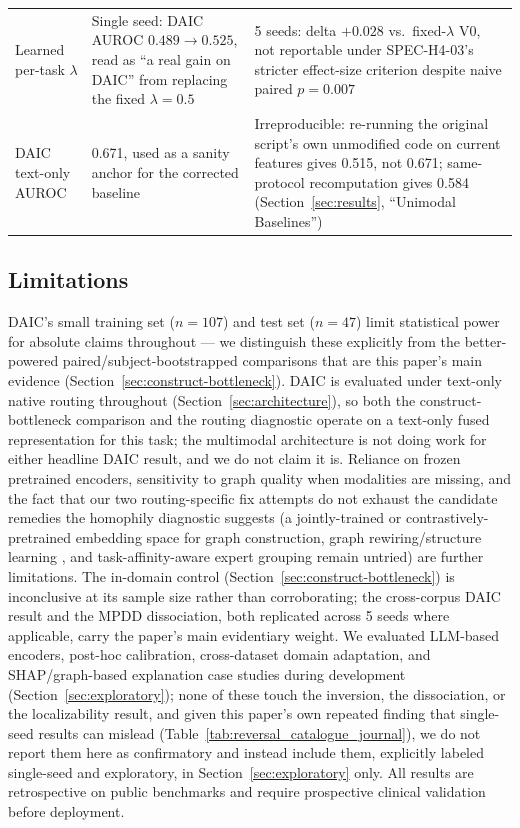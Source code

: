 \documentclass[twocolumn]{article}
\begin{document}
\begin{table}[t]
\begin{tabular}{p{}p{}p{}}
Learned per-task $\lambda$ & Single seed: DAIC AUROC $0.489 \to 0.525$, read as ``a real gain on DAIC'' from replacing the fixed $\lambda{=}0.5$ & 5 seeds: delta $+0.028$ vs.\ fixed-$\lambda$ V0, not reportable under SPEC-H4-03's stricter effect-size criterion despite naive paired $p{=}0.007$ \\
DAIC text-only AUROC & 0.671, used as a sanity anchor for the corrected baseline & Irreproducible: re-running the original script's own unmodified code on current features gives 0.515, not 0.671; same-protocol recomputation gives 0.584 (Section~\ref{sec:results}, ``Unimodal Baselines'') \\
\bottomrule
\end{tabular}
\end{table}

\subsection{Limitations}

DAIC's small training set ($n{=}107$) and test set ($n{=}47$) limit statistical power for absolute claims throughout — we distinguish these explicitly from the better-powered paired/subject-bootstrapped comparisons that are this paper's main evidence (Section~\ref{sec:construct-bottleneck}). DAIC is evaluated under text-only native routing throughout (Section~\ref{sec:architecture}), so both the construct-bottleneck comparison and the routing diagnostic operate on a text-only fused representation for this task; the multimodal architecture is not doing work for either headline DAIC result, and we do not claim it is. Reliance on frozen pretrained encoders, sensitivity to graph quality when modalities are missing, and the fact that our two routing-specific fix attempts do not exhaust the candidate remedies the homophily diagnostic suggests (a jointly-trained or contrastively-pretrained embedding space for graph construction, graph rewiring/structure learning \citep{attali2026graphrewiring}, and task-affinity-aware expert grouping \citep{li2023boosting} remain untried) are further limitations. The in-domain control (Section~\ref{sec:construct-bottleneck}) is inconclusive at its sample size rather than corroborating; the cross-corpus DAIC result and the MPDD dissociation, both replicated across 5 seeds where applicable, carry the paper's main evidentiary weight. We evaluated LLM-based encoders, post-hoc calibration, cross-dataset domain adaptation, and SHAP/graph-based explanation case studies during development (Section~\ref{sec:exploratory}); none of these touch the inversion, the dissociation, or the localizability result, and given this paper's own repeated finding that single-seed results can mislead (Table~\ref{tab:reversal_catalogue_journal}), we do not report them here as confirmatory and instead include them, explicitly labeled single-seed and exploratory, in Section~\ref{sec:exploratory} only. All results are retrospective on public benchmarks and require prospective clinical validation before deployment.
\end{document}
